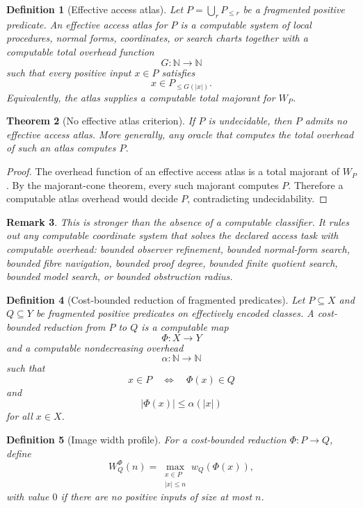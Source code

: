 \documentclass[11pt]{article}
\newtheorem{theorem}{Theorem}[section]
\newtheorem{definition}[theorem]{Definition}
\newtheorem{remark}[theorem]{Remark}
\begin{document}
\begin{definition}[Effective access atlas]
Let \(P=\bigcup_rP_{\le r}\) be a fragmented positive predicate. An effective access atlas for \(P\) is a computable system of local procedures, normal forms, coordinates, or search charts together with a computable total overhead function
\[
G:\mathbb N\to\mathbb N
\]
such that every positive input \(x\in P\) satisfies
\[
x\in P_{\le G(|x|)}.
\]
Equivalently, the atlas supplies a computable total majorant for \(W_P\).
\end{definition}

\begin{theorem}[No effective atlas criterion]
If \(P\) is undecidable, then \(P\) admits no effective access atlas. More generally, any oracle that computes the total overhead of such an atlas computes \(P\).
\end{theorem}

\begin{proof}
The overhead function of an effective access atlas is a total majorant of \(W_P\). By the majorant-cone theorem, every such majorant computes \(P\). Therefore a computable atlas overhead would decide \(P\), contradicting undecidability.
\end{proof}

\begin{remark}
This is stronger than the absence of a computable classifier. It rules out any computable coordinate system that solves the declared access task with computable overhead: bounded observer refinement, bounded normal-form search, bounded fibre navigation, bounded proof degree, bounded finite quotient search, bounded model search, or bounded obstruction radius.
\end{remark}

\begin{definition}[Cost-bounded reduction of fragmented predicates]
Let \(P\subseteq X\) and \(Q\subseteq Y\) be fragmented positive predicates on effectively encoded classes. A cost-bounded reduction from \(P\) to \(Q\) is a computable map
\[
\Phi:X\to Y
\]
and a computable nondecreasing overhead
\[
\alpha:\mathbb N\to\mathbb N
\]
such that
\[
x\in P
\quad\Longleftrightarrow\quad
\Phi(x)\in Q
\]
and
\[
|\Phi(x)|\le \alpha(|x|)
\]
for all \(x\in X\).
\end{definition}

\begin{definition}[Image width profile]
For a cost-bounded reduction \(\Phi:P\to Q\), define
\[
W_Q^\Phi(n)
=
\max_{\substack{x\in P\\ |x|\le n}}
w_Q(\Phi(x)),
\]
with value \(0\) if there are no positive inputs of size at most \(n\).
\end{definition}
\end{document}
